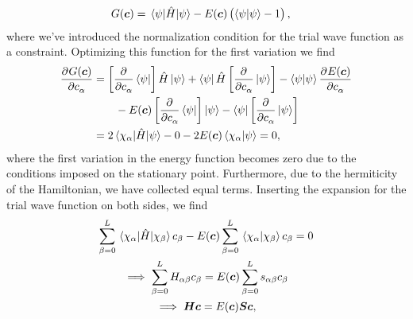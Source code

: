             \begin{align}
                G(\boldsymbol{c})
                &=
                \mel*{\psi}{\hat{H}}{\psi}
                - E(\boldsymbol{c}) \left( \braket{\psi}{\psi} - 1 \right),
            \end{align}
            where we've introduced the normalization condition for the trial
            wave function as a constraint.
            Optimizing this function for the first variation we find
            \begin{align}
                \dpd[]{G(\vfg{c})}{c_{\alpha}}
                &=
                \brak{
                    \dpd[]{}{c_{\alpha}}
                    \bra{\psi}
                }\hamil\ket{\psi}
                + \bra{\psi}\hamil
                \brak{
                    \dpd[]{}{c_{\alpha}}
                    \ket{\psi}
                }
                -
                \braket{\psi}{\psi}
                \dpd[]{E(\vfg{c})}{c_{\alpha}}
                \nonumber \\
                &\qquad
                -
                E(\vfg{c})
                \brak{
                    \dpd[]{}{c_{\alpha}}
                    \bra{\psi}
                }\ket{\psi}
                -
                \bra{\psi}
                \brak{
                    \dpd[]{}{c_{\alpha}}
                    \ket{\psi}
                }
                \\
                &=
                2 \mel*{\chi_{\alpha}}{\hamil}{\psi}
                - 0
                - 2E(\vfg{c})\braket{\chi_{\alpha}}{\psi}
                = 0,
            \end{align}
            where the first variation in the energy function becomes zero due to
            the conditions imposed on the stationary point.
            Furthermore, due to the hermiticity of the Hamiltonian, we have
            collected equal terms.
            Inserting the expansion for the trial wave function on both sides,
            we find
            \begin{gather}
                \sum_{\beta = 0}^{L}
                \mel*{\chi_{\alpha}}{\hat{H}}{\chi_{\beta}} c_{\beta}
                - E(\boldsymbol{c})\sum_{\beta = 0}^{L}
                \braket*{\chi_{\alpha}}{\chi_{\beta}} c_{\beta}
                = 0
                \\
                \implies
                \sum_{\beta = 0}^{L}
                H_{\alpha\beta} c_{\beta}
                = E(\boldsymbol{c})
                \sum_{\beta = 0}^{L}
                s_{\alpha\beta} c_{\beta}
                \\
                \implies
                \boldsymbol{H} \boldsymbol{c}
                = E(\boldsymbol{c}) \boldsymbol{S} \boldsymbol{c},
                \label{eq:variational-eigenvalue}
            \end{gather}
